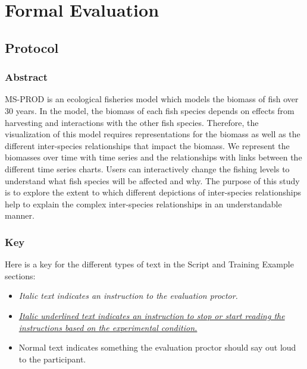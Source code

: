 \chapter{Formal Evaluation}

\section{Protocol}

{\setlength{\parskip}{1em} {\setlength{\parindent}{0cm}
{\singlespacing

\subsection{Abstract}

MS-PROD is an ecological fisheries model which models the biomass of fish over 30 years.  In the model, the biomass of each fish species depends on effects from harvesting and interactions with the other fish species.  Therefore, the visualization of this model requires representations for the biomass as well as the different inter-species relationships that impact the biomass.  We represent the biomasses over time with time series and the relationships with links between the different time series charts.  Users can interactively change the fishing levels to understand what fish species will be affected and why.  The purpose of this study is to explore the extent to which different depictions of inter-species relationships help to explain the complex inter-species relationships in an understandable manner.

\subsection{Key}

Here is a key for the different types of text in the Script and Training Example sections:

\begin{itemize}
\item \textit{Italic text indicates an instruction to the evaluation proctor.}
\item \textit{\underline{Italic underlined text indicates an instruction to stop or start reading the} \\ \underline{instructions based on the experimental condition.}}
\item Normal text indicates something the evaluation proctor should say out loud to the participant. 
\end{itemize}

}}}
